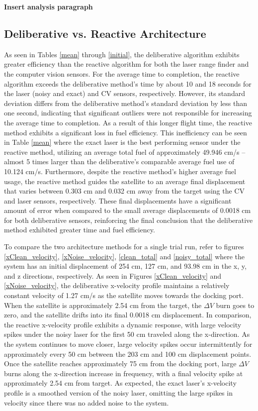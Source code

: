 \documentclass[journal, 10pt]{IEEEtran}
\begin{document}
\textbf{Insert analysis paragraph}

\subsection{Deliberative vs. Reactive Architecture}

As seen in Tables \ref{mean} through \ref{initial}, the deliberative algorithm exhibits greater efficiency than the reactive algorithm for both the laser range finder and the computer vision sensors. For the average time to completion, the reactive algorithm exceeds the deliberative method's time by about 10 and 18 seconds for the laser (noisy and exact) and CV sensors, respectively. However, its standard deviation differs from the deliberative method's standard deviation by less than one second, indicating that significant outliers were not responsible for increasing the average time to completion. As a result of this longer flight time, the reactive method exhibits a significant loss in fuel efficiency. This inefficiency can be seen in Table \ref{mean} where the exact laser is the best performing sensor under the reactive method, utilizing an average total fuel of approximately 49.946 cm/s -- almost 5 times larger than the deliberative's comparable average fuel use of 10.124 cm/s. Furthermore, despite the reactive method's higher average fuel usage, the reactive method guides the satellite to an average final displacement that varies between 0.303 cm and 0.032 cm away from the target using the CV and laser sensors, respectively. These final displacements have a significant amount of error when compared to the small average displacements of 0.0018 cm for both deliberative sensors, reinforcing the final conclusion that the deliberative method exhibited greater time and fuel efficiency.

To compare the two architecture methods for a single trial run, refer to figures \ref{xClean_velocity}, \ref{xNoise_velocity}, \ref{clean_total} and \ref{noisy_total} where the system has an initial displacement of 254 cm, 127 cm, and 93.98 cm in the x, y, and z directions, respectively. As seen in Figures \ref{xClean_velocity} and \ref{xNoise_velocity}, the deliberative x-velocity profile maintains a relatively constant velocity of 1.27 cm/s as the satellite moves towards the docking port. When the satellite is approximately 2.54 cm from the target, the $\Delta V$ burn goes to zero, and the satellite drifts into its final 0.0018 cm displacement. In comparison, the reactive x-velocity profile exhibits a dynamic response, with large velocity spikes under the noisy laser for the first 50 cm traveled along the x-direction. As the system continues to move closer, large velocity spikes occur intermittently for approximately every 50 cm between the 203 cm and 100 cm displacement points. Once the satellite reaches approximately 75 cm from the docking port, large $\Delta V$  burns along the x-direction increase in frequency, with a final velocity spike at approximately 2.54 cm from target. As expected, the exact laser's x-velocity profile is a smoothed version of the noisy laser, omitting the large spikes in velocity since there was no added noise to the system. 
\end{document}
